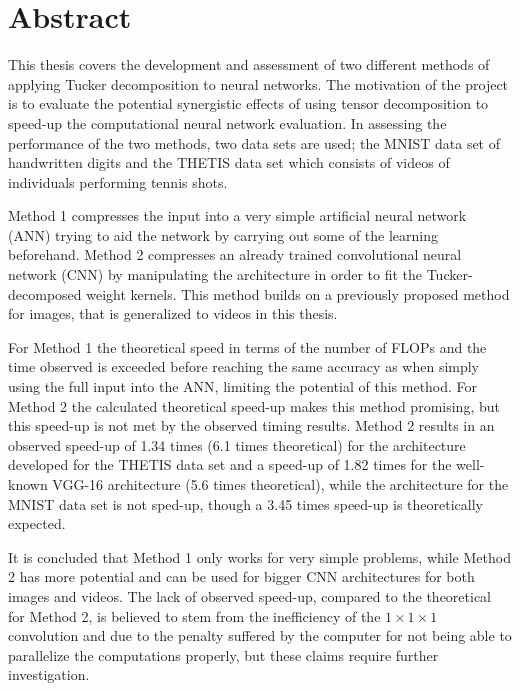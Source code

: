 \section{Abstract}

This thesis covers the development and assessment of two different methods of applying Tucker decomposition to neural networks. The motivation of the project is to evaluate the potential synergistic effects of using tensor decomposition to speed-up the computational neural network evaluation. In assessing the performance of the two methods, two data sets are used; the MNIST data set of handwritten digits and the THETIS data set which consists of videos of individuals performing tennis shots.

\noindent Method 1 compresses the input into a very simple artificial neural network (ANN) trying to aid the network by carrying out some of the learning beforehand. Method 2 compresses an already trained convolutional neural network (CNN) by manipulating the architecture in order to fit the Tucker-decomposed weight kernels. This method builds on a previously proposed method for images, that is generalized to videos in this thesis.

\noindent For Method 1 the theoretical speed in terms of the number of FLOPs and the time observed is exceeded before reaching the same accuracy as when simply using the full input into the ANN, limiting the potential of this method. For Method 2 the calculated theoretical speed-up makes this method promising, but this speed-up is not met by the observed timing results. Method 2 results in an observed speed-up of 1.34 times (6.1 times theoretical) for the architecture developed for the THETIS data set and a speed-up of 1.82 times for the well-known VGG-16 architecture (5.6 times theoretical), while the architecture for the MNIST data set is not sped-up, though a 3.45 times speed-up is theoretically expected.

\noindent It is concluded that Method 1 only works for very simple problems, while Method 2 has more potential and can be used for bigger CNN architectures for both images and videos. The lack of observed speed-up, compared to the theoretical for Method 2, is believed to stem from the inefficiency of the $1\times 1\times 1$ convolution and due to the penalty suffered by the computer for not being able to parallelize the computations properly, but these claims require further investigation.